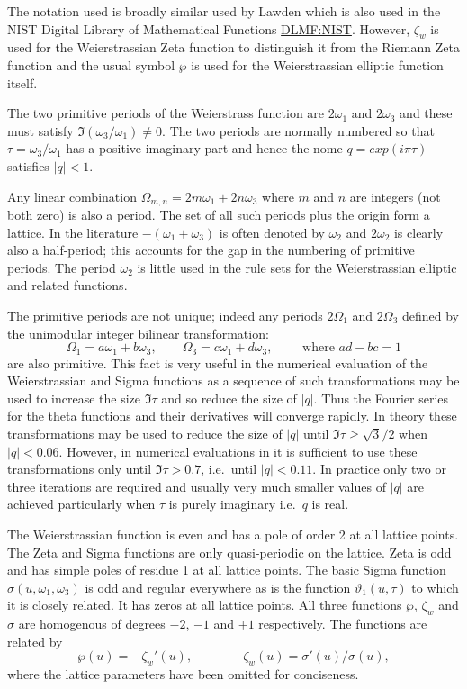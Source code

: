 The notation used is broadly similar used by Lawden \cite{Lawden:89} which is also used in the
NIST Digital Library of Mathematical Functions \href{https://dlmf.nist.gov/}{DLMF:NIST}. However,
$\zeta_w$ is used for the Weierstrassian Zeta function to distinguish it from the Riemann Zeta
function and the usual symbol $\wp$ is used for the Weierstrassian elliptic function itself.

The two primitive periods of the Weierstrass function are $2\omega_1$ and $2\omega_3$ and these must satisfy
$\Im(\omega_3/\omega_1) \neq 0$. The two periods are normally numbered so that $\tau = \omega_3/\omega_1$ has
a positive imaginary part and hence the nome $q = exp(i\pi\tau)$ satisfies $|q| <1$.

Any linear combination $\Omega_{m,n} = 2m\omega_1 +2n\omega_3$ where $m$ and $n$ are
integers (not both zero) is also a period. The set of all such periods plus the origin form a lattice. In the literature
$-(\omega_1+\omega_3)$ is often denoted by $\omega_2$ and $2\omega_2$ is clearly also a half-period; this
accounts for the gap in the numbering of primitive periods. The period $\omega_2$ is little used in the \REDUCE rule sets for
the Weierstrassian elliptic and related functions.

The primitive periods are not unique;
indeed any periods $2\Omega_1$ and $2\Omega_3$ defined by the unimodular integer bilinear transformation:
\[\Omega_1 = a\omega_1 + b\omega_3,\qquad\Omega_3 = c\omega_1 + d\omega_3,\qquad\text{ where }ad-bc = 1\]
are also primitive. This fact is very useful in the numerical evaluation of the Weierstrassian and Sigma
functions as a sequence of such transformations may be used to increase the size $\Im \tau$ and so reduce
the size of $|q|$. Thus the Fourier series for the theta functions and their derivatives will converge rapidly.
In theory these transformations may be used to reduce the size of $|q|$ until $\Im \tau \geq \sqrt 3/2$ when
$|q|<0.06$. However, in numerical evaluations in \REDUCE it is sufficient to use these transformations only until
$\Im \tau > 0.7$, i.e.~until $|q| < 0.11$. In practice only two or three iterations are required
and usually very much smaller values of $|q|$ are achieved particularly when $\tau$ is purely imaginary i.e.~$q$ is real.

The Weierstrassian function is even and has a pole of order 2 at all lattice points.
The Zeta and Sigma functions are only quasi-periodic on the lattice. Zeta is odd and has simple poles of residue
1 at all lattice points. The basic Sigma function $\sigma(u,\omega_1,\omega_3)$ is odd
and regular everywhere as is the function $\vartheta_1(u,\tau)$ to which it is closely related.
It has zeros at all lattice points. All three functions $\wp$, $\zeta_w$ and $\sigma$ are
homogenous of degrees $-2$, $-1$ and $+1$ respectively. The functions are related by
\[ \wp(u) = -\zeta_w'(u),\qquad\qquad \zeta_w(u) = \sigma'(u)/\sigma(u),\]
where the lattice parameters have been omitted for conciseness.

